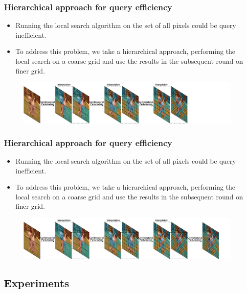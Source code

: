 \documentclass[10pt,mathserif]{beamer}
\begin{document}
\begin{frame}
    \frametitle{Hierarchical approach for query efficiency}
    \begin{itemize}\itemsep=12pt
        \item Running the local search algorithm on the set of all pixels could be query inefficient.
        \item To address this problem, we take a hierarchical approach, performing the local search on a coarse grid and use the results in the subsequent round on finer grid.
    \end{itemize}
    \begin{figure}
        \centering
        \hspace*{-2.5em}
        \includegraphics[scale=0.35]{figures/hierarchical_4.png}
    \end{figure}
\end{frame}

\begin{frame}
    \frametitle{Hierarchical approach for query efficiency}
    \begin{itemize}\itemsep=12pt
        \item Running the local search algorithm on the set of all pixels could be query inefficient.
        \item To address this problem, we take a hierarchical approach, performing the local search on a coarse grid and use the results in the subsequent round on finer grid.
    \end{itemize}
    \begin{figure}
        \centering
        \hspace*{-2.5em}
        \includegraphics[scale=0.35]{figures/hierarchical_5.png}
    \end{figure}
\end{frame}

\subsection{Experiments}
\end{document}
